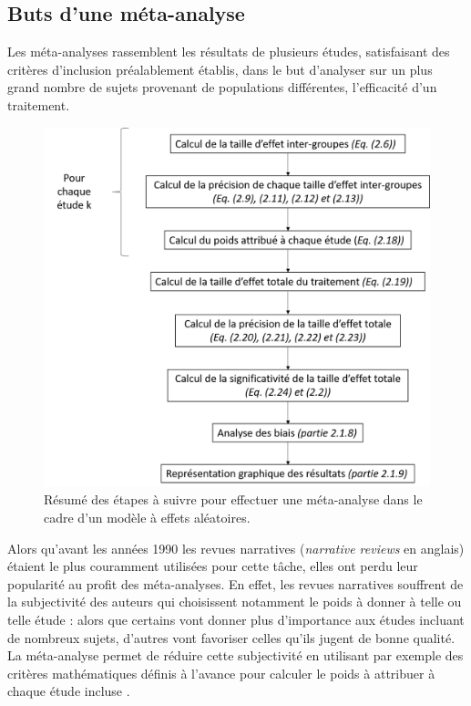 \subsection{Buts d'une méta-analyse}

Les méta-analyses rassemblent les résultats de plusieurs études, satisfaisant des critères d'inclusion préalablement établis, dans le but d'analyser
sur un plus grand nombre de sujets provenant de populations différentes, l'efficacité d'un traitement. 

\begin{figure}[h!]
  \centering
	\includegraphics[width=1.0\linewidth]{figures/chapter-2/pipeline-perform-meta-analysis} 
  \caption[Résumé des étapes d'une méta-analyse.]{Résumé des étapes à suivre pour effectuer une méta-analyse dans le cadre d'un modèle à effets aléatoires.}
  \label{Figure:pipeline_meta_analyse}
\end{figure}

Alors qu'avant les années 1990 les revues narratives (\textit{narrative reviews} en anglais) étaient le plus couramment utilisées pour cette tâche, elles ont 
perdu leur popularité au profit des méta-analyses. En effet, les revues narratives souffrent de la subjectivité des auteurs qui choisissent notamment le poids 
à donner à telle ou telle étude : alors que certains
vont donner plus d'importance aux études incluant de nombreux sujets, d'autres vont favoriser celles qu'ils jugent de bonne qualité. La méta-analyse permet 
de réduire cette subjectivité en utilisant par exemple des critères mathématiques définis à l'avance pour calculer le poids à attribuer à chaque étude incluse
\citep[Chapitre~1]{Borenstein2009}. 

